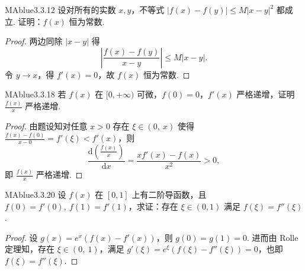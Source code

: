 \begin{problem}{MAblue}{3.3.12}
    设对所有的实数 $x, y$，不等式 $|f(x) - f(y)| \leqslant M|x-y|^2$ 都成立. 证明：$f(x)$ 恒为常数.
\end{problem}

\begin{proof}
    两边同除 $|x-y|$ 得
    \[
        \left| \frac{f(x)-f(y)}{x-y} \right| \leqslant M|x-y|.
    \]
    令 $y \to x$，得 $f'(x) = 0$，故 $f(x)$ 恒为常数.
\end{proof}

\begin{problem}{MAblue}{3.3.18}
    若 $f(x)$ 在 $[0, +\infty)$ 可微，$f(0) = 0$，$f'(x)$ 严格递增，证明 $\frac {f(x)} x$ 严格递增.
\end{problem}

\begin{proof}
    由题设知对任意 $x > 0$ 存在 $\xi \in (0,\ x)$ 使得 $\frac{f(x)-f(0)}{x-0} = f'(\xi) < f'(x)$，则
    \[
        \frac{\mathrm d \left( \frac{f(x)}{x} \right)}{\mathrm dx} = \frac{xf'(x)-f(x)}{x^2} > 0,
    \]
    即 $\frac{f(x)}{x}$ 严格递增.
\end{proof}

\begin{problem}{MAblue}{3.3.20}
    设 $f(x)$ 在 $[0, 1]$ 上有二阶导函数，且 $f(0) = f'(0),\ f(1) = f'(1)$，求证：存在 $\xi \in (0, 1)$ 满足 $f(\xi) = f''(\xi)$.
\end{problem}

\begin{proof}
    设 $g(x)=e^x\left( f(x)-f'(x) \right)$，则 $g(0) = g(1) = 0$. 进而由 Rolle 定理知，存在 $\xi \in (0,\ 1)$，满足 $g'(\xi) = e^{\xi}\left( f(\xi) - f''(\xi) \right) = 0$，也即 $f(\xi) = f''(\xi)$.
\end{proof}

